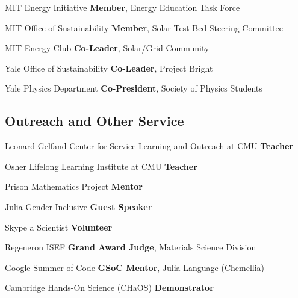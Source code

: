 {MIT Energy Initiative}
{\textbf{Member}, Energy Education Task Force}
{}

{MIT Office of Sustainability}
{\textbf{Member}, Solar Test Bed Steering Committee}
{}

{MIT Energy Club}
{\textbf{Co-Leader}, Solar/Grid Community}
{}

{Yale Office of Sustainability}
{\textbf{Co-Leader}, Project Bright}
{}

{Yale Physics Department}
{\textbf{Co-President}, Society of Physics Students}
{}

\vspace{-2.5mm}
\subsection{Outreach and Other Service}
\vspace{-1mm}
                      {Leonard Gelfand Center for Service Learning and Outreach at CMU}
                      {\textbf{Teacher}}{}

                      {Osher Lifelong Learning Institute at CMU}
                      {\textbf{Teacher}}{}
                     

{Prison Mathematics Project}
{\textbf{Mentor}}
{}

{Julia Gender Inclusive}
{\textbf{Guest Speaker}}
{}

{Skype a Scientist}
{\textbf{Volunteer}}
{}

{Regeneron ISEF}
{\textbf{Grand Award Judge}, Materials Science Division}
{}

{Google Summer of Code}
{\textbf{GSoC Mentor}, Julia Language (Chemellia)}
{}

{Cambridge Hands-On Science (CHaOS)}
{\textbf{Demonstrator}}
{}
